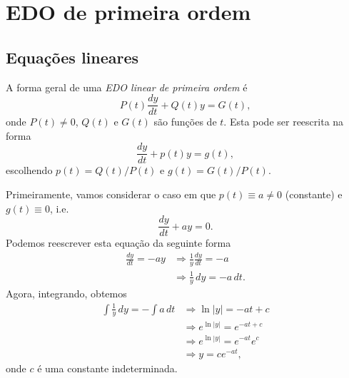 
\chapter{EDO de primeira ordem}\label{cap_edo1ordem}
\thispagestyle{fancy}

\section{Equações lineares}\label{cap_edo1ordem_sec_eqlinear}

A forma geral de uma \emph{EDO linear de primeira ordem} é
\begin{equation}
  P(t)\frac{dy}{dt} + Q(t)y = G(t),
\end{equation}
onde $P(t) \neq 0$, $Q(t)$ e $G(t)$ são funções de $t$. Esta pode ser reescrita na forma
\begin{equation}
  \frac{dy}{dt} + p(t)y = g(t),
\end{equation}
escolhendo $p(t) = Q(t)/P(t)$ e $g(t) = G(t)/P(t)$.

Primeiramente, vamos considerar o caso em que $p(t) \equiv a \neq 0$ (constante) e $g(t) \equiv 0$, i.e.
\begin{equation}\label{eq:edo1linear_pc_g0}
  \frac{dy}{dt} + ay = 0.
\end{equation}
Podemos reescrever esta equação da seguinte forma
\begin{align}
  \frac{dy}{dt} = -ay &\Rightarrow \frac{1}{y}\frac{dy}{dt} = -a \\
                     &\Rightarrow \frac{1}{y}\,dy = -a\,dt.
\end{align}
Agora, integrando, obtemos
\begin{align}
  \int \frac{1}{y}\,dy = -\int a\,dt &\Rightarrow \ln|y| = -at + c \\
                                    &\Rightarrow e^{\ln|y|} = e^{-at + c} \\
                                    &\Rightarrow e^{\ln|y|} = e^{-at}e^c \\
                                    &\Rightarrow y = ce^{-at},
\end{align}
onde $c$ é uma constante indeterminada.


